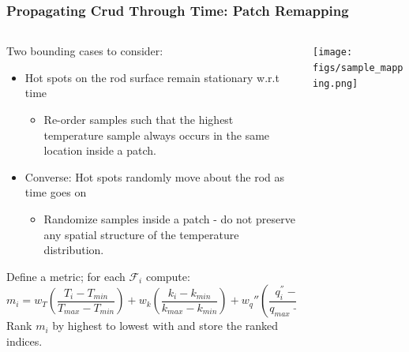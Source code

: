 \documentclass[t, pdftex]{beamer}
\begin{document}
\begin{frame}[shrink=20]
\frametitle{Propagating Crud Through Time: Patch Remapping}
\begin{columns}
\begin{column}{0.5\textwidth}
    Two bounding cases to consider:
\scriptsize{
   
\begin{itemize}
\item Hot spots on the rod surface remain stationary w.r.t time
	\begin{itemize}
	\item Re-order samples such that the highest temperature sample always occurs in the same location inside a patch.
	\end{itemize}
\item Converse: Hot spots randomly move about the rod as time goes on
	\begin{itemize}
	\item Randomize samples inside a patch - do not preserve any spatial structure of the temperature distribution.
	\end{itemize}
\end{itemize}
Define a metric; for each $\mathcal F_i$ compute:
\[
    m_i = w_T \left( \frac{T_i - T_{min}}{T_{max} - T_{min}} \right) + w_k \left( \frac{k_i - k_{min}}{k_{max} - k_{min}} \right) +  w_q'' \left( \frac{q^{''}_i - q^{''}_{min}}{q_{max} - q_{min}} \right)
\]
Rank $m_i$ by highest to lowest with and store the ranked indices.
}
\end{column}
\begin{column}{0.5\textwidth}  %
    \begin{center}
     \texttt{[image: figs/sample\_mapping.png]}
     \end{center}
\end{column}
\end{columns}
\end{frame}
\end{document}
